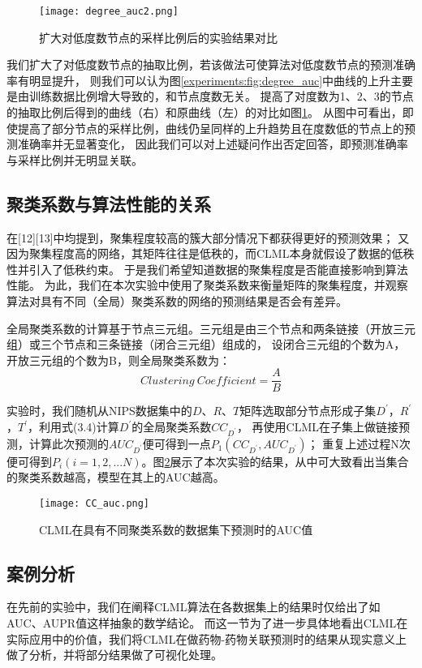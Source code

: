\begin{figure}
    \centering
    \texttt{[image: degree\_auc2.png]}
    \caption{扩大对低度数节点的采样比例后的实验结果对比}
    \label{experiments:fig:degree_auc2}
\end{figure}

我们扩大了对低度数节点的抽取比例，若该做法可使算法对低度数节点的预测准确率有明显提升，
则我们可以认为图\ref{experiments:fig:degree_auc}中曲线的上升主要是由训练数据比例增大导致的，和节点度数无关。
提高了对度数为1、2、3的节点的抽取比例后得到的曲线（右）和原曲线（左）的对比如图\ref{experiments:fig:degree_auc2}。
从图中可看出，即使提高了部分节点的采样比例，曲线仍呈同样的上升趋势且在度数低的节点上的预测准确率并无显著变化，
因此我们可以对上述疑问作出否定回答，即预测准确率与采样比例并无明显关联。


\subsection{聚类系数与算法性能的关系}
在[12][13]中均提到，聚集程度较高的簇大部分情况下都获得更好的预测效果；
又因为聚集程度高的网络，其矩阵往往是低秩的，而CLML本身就假设了数据的低秩性并引入了低秩约束。
于是我们希望知道数据的聚集程度是否能直接影响到算法性能。
为此，我们在本次实验中使用了聚类系数来衡量矩阵的聚集程度，并观察算法对具有不同（全局）聚类系数的网络的预测结果是否会有差异。


全局聚类系数的计算基于节点三元组。三元组是由三个节点和两条链接（开放三元组）或三个节点和三条链接（闭合三元组）组成的，
设闭合三元组的个数为A，开放三元组的个数为B，则全局聚类系数为：
\begin{equation}
Clustering\ Coefficient=\frac{A}{B}
\end{equation}


实验时，我们随机从NIPS数据集中的$D$、$R$、$T$矩阵选取部分节点形成子集$D^{'}$，$R^{'}$，$T^{'}$，利用式(3.4)计算$D^{'}$的全局聚类系数$CC_{D^{'}}$，
再使用CLML在子集上做链接预测，计算此次预测的$AUC_{D^{'}}$便可得到一点$P_1(CC_{D^{'}}, AUC_{D^{'}})$；
重复上述过程N次便可得到$P_i(i=1,2,...N)$。图\ref{experiments:fig:cc_auc}展示了本次实验的结果，从中可大致看出当集合的聚类系数越高，模型在其上的AUC越高。


\begin{figure}
    \centering
    \texttt{[image: CC\_auc.png]}
    \caption{CLML在具有不同聚类系数的数据集下预测时的AUC值}
    \label{experiments:fig:cc_auc}
\end{figure}


\subsection{案例分析}
在先前的实验中，我们在阐释CLML算法在各数据集上的结果时仅给出了如AUC、AUPR值这样抽象的数学结论。
而这一节为了进一步具体地看出CLML在实际应用中的价值，我们将CLML在做药物-药物关联预测时的结果从现实意义上做了分析，并将部分结果做了可视化处理。


